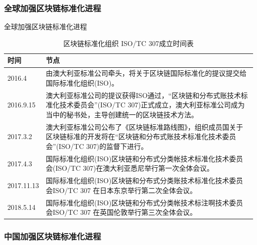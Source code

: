 \documentclass[11pt]{beamer}
\begin{document}
\subsubsection{全球加强区块链标准化进程}
\begin{frame}{全球加强区块链标准化进程}
	\begin{table}[]
		\footnotesize
		\begin{tabular}{p{}p{}}
			\toprule
			时间       & 节点                                                                                                                                                            \\ \midrule
			2016.4     & 由澳大利亚标准公司牵头，将关于区块链国际标准化的提议提交给国际标准化组织(ISO)。                                                                                 \\
			2016.9.15  & 澳大利亚标准公司的提议获得ISO通过，“区块链和分布式账技术标准化技术委员会”(ISO/TC 307)正式成立，澳大利亚标准公司成为当中的秘书处，主导创建统一的区块链技术方法。 \\
			2017.3.2   & 澳大利亚标准公司公布了《区块链标准路线图》，组织成员国关于区块链标准的开发将在“区块链和分布式账技术标准化技术委员会”(ISO/TC 307)的监督下进行。                  \\
			2017.4.3   & 国际标准化组织(ISO)区块链和分布式分类帐技术标准化技术委员会(ISO/TC 307)在澳大利亚悉尼举行第一次全体会议。                                                       \\
			2017.11.13 & 国际标准化组织(ISO)区块链和分布式分类账技术标准化技术委员会ISO/TC 307 在日本东京举行第二次全体会议。                                                            \\
			2018.5.14  & 国际标准化组织(ISO)区块链和分布式分类帐技术标注啊技术委员会ISO/TC 307 在英国伦敦举行第三次全体会议。                                                            \\
			\bottomrule
		\end{tabular}
		\caption{区块链标准化组织 ISO/TC 307成立时间表}
		\label{tab:ISOTC307}
	\end{table}
\end{frame}

\subsubsection{中国加强区块链标准化进程}
\end{document}
